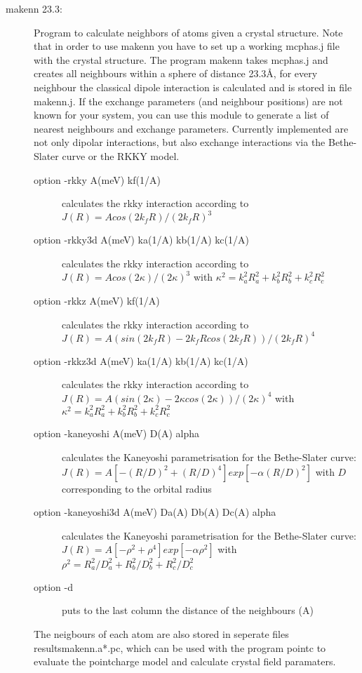 \begin{description}
\item[\prg makenn 23.3:] Program to calculate neighbors of atoms given a crystal structure.
Note that in order to use {\prg makenn} you have to set up a 
working {\prg mcphas.j} file with the crystal structure. 
The program {\prg makenn} takes {\prg mcphas.j} and
creates all neighbours within a sphere of distance 23.3\AA, for every neighbour the classical
dipole interaction is calculated and is stored in file {\prg makenn.j}. If the exchange %
parameters 
(and neighbour positions) are not known for your system, you can use this module 
to generate a list of nearest neighbours and exchange parameters. Currently implemented 
 are not only dipolar interactions, but also exchange interactions via the Bethe-Slater 
curve or the RKKY model. 
\begin{description}
\item[option {\prg -rkky A(meV) kf(1/A)}] calculates the rkky interaction according to $J(R)=A %
cos(2 k_f R)/(2 k_f R)^3$
\item[option {\prg -rkky3d A(meV) ka(1/A) kb(1/A) kc(1/A)}] calculates the rkky interaction %
according to $J(R)=A cos(2 \kappa)/(2 \kappa)^3$ with $\kappa^2=k_a^2 R_a^2 + k_b^2 R_b^2 + %
k_c^2 R_c^2$
\item[option {\prg -rkkz A(meV) kf(1/A)}] calculates the rkky interaction according to $J(R)=A %
(sin(2 k_f R)- 2 k_f R cos(2 k_f R))/(2 k_f R)^4$
\item[option {\prg -rkkz3d A(meV) ka(1/A) kb(1/A) kc(1/A)}] calculates the rkky interaction %
according to $J(R)=A (sin(2 \kappa)- 2 \kappa cos(2 \kappa))/(2 \kappa)^4$ with $\kappa^2=k_a^2 %
R_a^2 + k_b^2 R_b^2 + k_c^2 R_c^2$
\item[option {\prg -kaneyoshi A(meV) D(A) alpha}] calculates the Kaneyoshi parametrisation for %
the Bethe-Slater
                               curve: $J(R)= A [-(R/D)^2+(R/D)^4]exp[-\alpha (R/D)^2]$  with $D$ %
corresponding
                               to the orbital radius
\item[option {\prg -kaneyoshi3d A(meV) Da(A) Db(A) Dc(A) alpha}] calculates the Kaneyoshi %
parametrisation for the Bethe-Slater
                               curve: $J(R)= A [-\rho^2+\rho^4]exp[-\alpha \rho^2]$  with %
$\rho^2=R_a^2/D_a^2+R_b^2/D_b^2+R_c^2/D_c^2$
\item[option {\prg -d}] puts to the last column the distance of the neighbours (A)
\end{description}
The neigbours of each atom are also stored in seperate files
{\prg results\/makenn.a*.pc}, which can be used with the program {\prg pointc} to evaluate
the pointcharge model and calculate crystal field paramaters.


\end{description}
